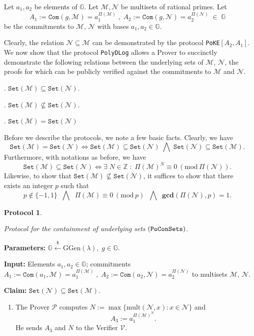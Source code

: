 \documentclass[11pt, lettersize, notitlepage, leqno, footskip=0.6cm]{article}
\newcommand{\bz}{\mathbb Z}
\newcommand{\ttt}{\texttt}
\newcommand{\bG}{\mathbb{G}}
\newcommand{\sett}{\ttt{Set}}
\newcommand{\LRA}{\Longleftrightarrow}
\newcommand{\mc}{\mathcal}
\newcommand{\mb}{\mathbb}
\newcommand{\mbf}{\mathbf}
\newcommand{\mr}{\mathrm}
\newcommand{\lamb}{\lambda}
\newcommand{\sub}{\subseteq}
\newcommand{\nsub}{\nsubseteq}
\newcommand{\mP}{\mc{P}}
\newcommand{\V}{\mc{V}}
\newcommand{\vs}{\vspace{-0.15cm}}
\newcommand{\noin}{\noindent}
\newcommand{\Mod}[1]{\ (\mathrm{mod}\ #1)}
\newcommand{\GCD}{\mbf{gcd}}
\newtheorem{Prot}[Thm]{Protocol}
\numberwithin{equation}{section}
\begin{document}
{{{\noin \hypertarget{Sets}{Let $a_1,a_2$ be elements of $\mb{G}$. Let $\mc{M} , \mc{N}$ be multisets of rational primes.} Let \vs $$A_1:= \ttt{Com}(g, \mc{M}) =  a_1^{\Pi(\mc{M})}\;,\; A_2:= \ttt{Com}(g, \mc{N}) = a_2^{\Pi(\mc{N})}\;\in\;\bG$$ be the commitments to $\mc{M}$, $\mc{N}$ with bases $a_1, a_2\in \bG$.

Clearly, the relation $\mc{N}\sub \mc{M}$ can be demonstrated by the protocol \verb|PoKE|$[A_2, A_1]$. We now show that the protocol \verb|PolyDLog| allows a Prover to succinctly demonstrate the following relations between the underlying sets of $\mc{M}$, $\mc{N}$, the proofs for which can be publicly verified against the commitments to $\mc{M}$ and $\mc{N}$.\vspace{0.1cm}

\noin 1. $\sett(\mc{M})\sub \sett(\mc{N})$.

\noin 2. $\sett(\mc{M})\nsub \sett(\mc{N})$.

\noin 3. $\sett(\mc{M}) = \sett(\mc{N})$ \vspace{0.1cm}

\noin Before we describe the protocols, we note a few basic facts. Clearly, we have \vs $$\sett(\mc{M}) = \sett(\mc{N})\LRA \sett(\mc{M}) \sub \sett(\mc{N})\;\bigwedge\; \sett(\mc{N}) \sub \sett(\mc{M}).$$ Furthermore, with notations as before, we have \vs $$\sett(\mc{M})\sub \sett(\mc{N})\LRA \exists\; N\in\bz\;:\;\Pi(\mc{M})^N\equiv 0\Mod{\Pi(\mc{N})}.$$ Likewise, to show that $\sett(\mc{M})\nsub \sett(\mc{N})$, it suffices to show that there exists an integer $p$ such that \vs $$p\notin \{-1,1\}   \;\;\bigwedge\;\;\Pi(\mc{M})\equiv 0\Mod{p} \;\;\bigwedge\;\; \GCD(\Pi(\mc{N}),{p})=1.$$

\begin{Prot} \hypertarget{Sets}{Protocol for the containment of underlying sets $(\tt{PoConSets})$.}\end{Prot} \vspace{-0.3cm}

\noin \textbf{Parameters:} $\mb{G}\xleftarrow{\$} \mr{GGen}(\lamb), \; g\in \mb{G}$.

\noin \textbf{Input:} Elements $a_1,a_2\in\mb{G}$; commitments $A_1 := \ttt{Com}(a_1, \mc{M}) = a_1^{\Pi(\mc{M})}\;,\;A_2 := \ttt{Com}(a_2, \mc{N})= a_2^{\Pi(\mc{N})}$ to multisets $\mc{M}$, $\mc{N}$.

\noin \textbf{Claim:} $\sett(\mc{N})\sub \sett(\mc{M})$. \vs

\begin{enumerate}[wide, labelwidth=!, labelindent=0pt] \item The Prover $\mP$ computes $N:= \max\{\mr{mult}(\mc{N}, x):x \in \mc{N}\}$ and \vs $$A_3:= a_1^{\Pi(\mc{M})^N}.$$ He sends $A_3$ and $N$ to the Verifier $\V$.


\end{enumerate}}}}
\end{document}

